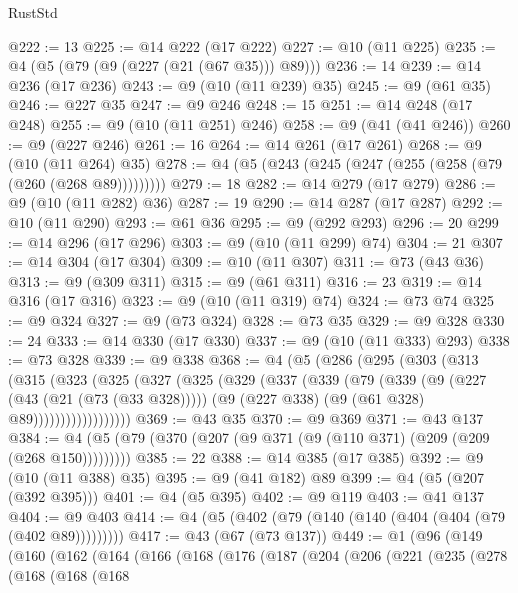 \begin{lexlean}{RustStd}
\begin{coremodule}
@222 := 13
@225 := @14 @222 (@17 @222)
@227 := @10 (@11 @225)
@235 := @4 (@5 (@79 (@9 (@227 (@21 (@67 @35))) @89)))
@236 := 14
@239 := @14 @236 (@17 @236)
@243 := @9 (@10 (@11 @239) @35)
@245 := @9 (@61 @35)
@246 := @227 @35
@247 := @9 @246
@248 := 15
@251 := @14 @248 (@17 @248)
@255 := @9 (@10 (@11 @251) @246)
@258 := @9 (@41 (@41 @246))
@260 := @9 (@227 @246)
@261 := 16
@264 := @14 @261 (@17 @261)
@268 := @9 (@10 (@11 @264) @35)
@278 := @4 (@5 (@243 (@245 (@247 (@255 (@258 (@79 (@260 (@268 @89)))))))))
@279 := 18
@282 := @14 @279 (@17 @279)
@286 := @9 (@10 (@11 @282) @36)
@287 := 19
@290 := @14 @287 (@17 @287)
@292 := @10 (@11 @290)
@293 := @61 @36
@295 := @9 (@292 @293)
@296 := 20
@299 := @14 @296 (@17 @296)
@303 := @9 (@10 (@11 @299) @74)
@304 := 21
@307 := @14 @304 (@17 @304)
@309 := @10 (@11 @307)
@311 := @73 (@43 @36)
@313 := @9 (@309 @311)
@315 := @9 (@61 @311)
@316 := 23
@319 := @14 @316 (@17 @316)
@323 := @9 (@10 (@11 @319) @74)
@324 := @73 @74
@325 := @9 @324
@327 := @9 (@73 @324)
@328 := @73 @35
@329 := @9 @328
@330 := 24
@333 := @14 @330 (@17 @330)
@337 := @9 (@10 (@11 @333) @293)
@338 := @73 @328
@339 := @9 @338
@368 := @4
    (@5
      (@286
        (@295
          (@303
            (@313
              (@315
                (@323
                  (@325
                    (@327
                      (@325
                        (@329
                          (@337
                            (@339
                              (@79
                                (@339
                                  (@9
                                    (@227 (@43 (@21 (@73 (@33 @328)))))
                                    (@9 (@227 @338) (@9 (@61 @328) @89))))))))))))))))))
@369 := @43 @35
@370 := @9 @369
@371 := @43 @137
@384 := @4 (@5 (@79 (@370 (@207 (@9 @371 (@9 (@110 @371) (@209 (@209 (@268 @150)))))))))
@385 := 22
@388 := @14 @385 (@17 @385)
@392 := @9 (@10 (@11 @388) @35)
@395 := @9 (@41 @182) @89
@399 := @4 (@5 (@207 (@392 @395)))
@401 := @4 (@5 @395)
@402 := @9 @119
@403 := @41 @137
@404 := @9 @403
@414 := @4 (@5 (@402 (@79 (@140 (@140 (@404 (@404 (@79 (@402 @89)))))))))
@417 := @43 (@67 (@73 @137))
@449 := @1
    (@96
      (@149
        (@160
          (@162
            (@164
              (@166
                (@168
                  (@176
                    (@187
                      (@204
                        (@206
                          (@221
                            (@235
                              (@278
                                (@168
                                  (@168
                                    (@168

\end{coremodule}
\end{lexlean}
